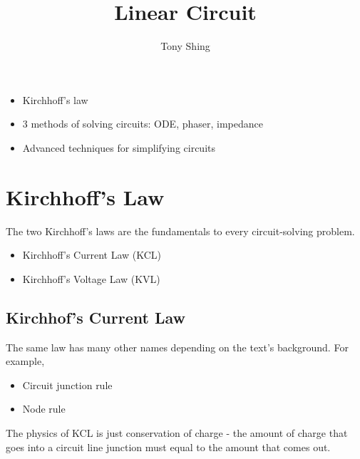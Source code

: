 \documentclass[class=article, crop=false, 12pt]{standalone}
\author{Tony Shing}
\title{Linear Circuit}
\begin{document}
\maketitle


\begin{overview}
    \begin{itemize}
        \item Kirchhoff's law
        \item 3 methods of solving circuits: ODE, phaser, impedance
        \item Advanced techniques for simplifying circuits
    \end{itemize}
\end{overview}



\section{Kirchhoff's Law}

The two Kirchhoff's laws are the fundamentals to every circuit-solving problem. 
\begin{itemize}
    \item Kirchhoff's Current Law (KCL)
    \item Kirchhoff's Voltage Law (KVL)
\end{itemize}

\subsection{Kirchhof's Current Law}


The same law has many other names depending on the text's background. 
For example,
\begin{itemize}
    \item Circuit junction rule
    \item Node rule
\end{itemize}

The physics of KCL is just conservation of charge - 
the amount of charge that goes into a circuit line junction 
must equal to the amount that comes out. 

\end{document}

